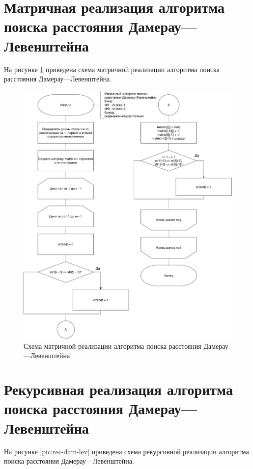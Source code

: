 \section{Матричная реализация алгоритма поиска расстояния Дамерау---Левенштейна}

На рисунке \ref{pic:matr-dam-lev} приведена схема матричной реализации алгоритма поиска расстояния Дамерау---Левенштейна.

\newpage

\begin{figure}[H]
	\centering
	\includegraphics[scale=0.55]{assets/dam-lev-matr.pdf}
	\caption{Схема матричной реализации алгоритма поиска расстояния Дамерау---Левенштейна}
	\label{pic:matr-dam-lev}
\end{figure}

\section{Рекурсивная реализация алгоритма поиска расстояния Дамерау---Левенштейна}

На рисунке \ref{pic:rec-dam-lev} приведена схема рекурсивной реализации алгоритма поиска расстояния Дамерау---Левенштейна.


